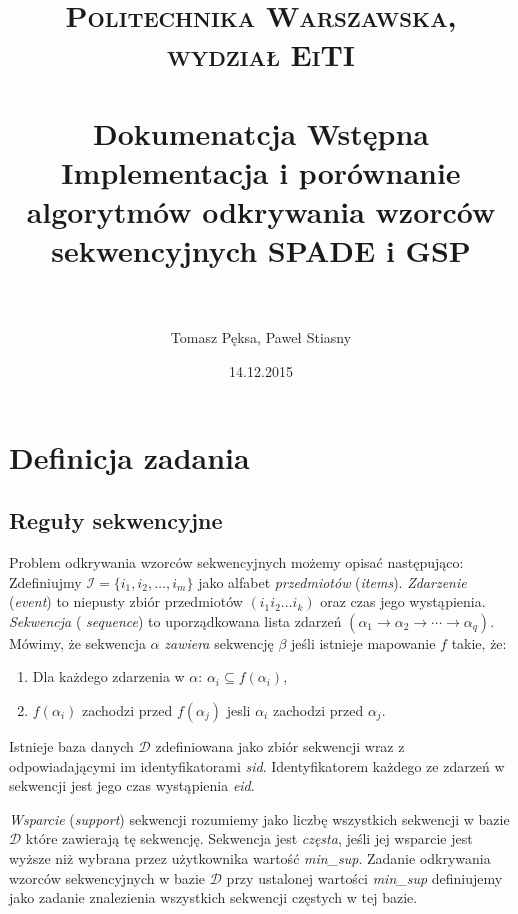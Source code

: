 \documentclass[paper=a4, fontsize=11pt]{scrartcl} %
\title{	
\normalfont \normalsize 
\textsc{Politechnika Warszawska, wydział EiTI} \\ [25pt] %
\horrule{0.5pt} \\[0.4cm] %
\huge Dokumenatcja Wstępna \\ %
\large Implementacja i porównanie algorytmów odkrywania wzorców sekwencyjnych SPADE i GSP \\
\horrule{2pt} \\[0.5cm] %
}
\author{Tomasz Pęksa, Paweł Stiasny} %
\date{\normalsize14.12.2015} %
\numberwithin{equation}{section} %
\numberwithin{figure}{section} %
\numberwithin{table}{section} %
\begin{document}
\maketitle %


\section{Definicja zadania}

\subsection{Reguły sekwencyjne}

Problem odkrywania wzorców sekwencyjnych możemy opisać następująco: Zdefiniujmy
\( \mathcal I = \{ i_1, i_2, \ldots, i_m \} \) jako alfabet {\em przedmiotów}
({\em items}).  {\em Zdarzenie} ({\em event}) to niepusty zbiór przedmiotów \(
( i_1i_2\ldots i_k ) \) oraz czas jego wystąpienia.  {\em Sekwencja} ({\em
sequence}) to uporządkowana lista zdarzeń \( ( \alpha_1 \rightarrow \alpha_2 \rightarrow \cdots \rightarrow \alpha_q ) \).
Mówimy, że sekwencja \( \alpha \) {\em zawiera} sekwencję \( \beta \) jeśli
istnieje mapowanie \( f \) takie, że:
\begin{enumerate}
    \item Dla każdego zdarzenia w \( \alpha \): \( \alpha_i \subseteq f(\alpha_i) \),
    \item \( f(\alpha_i) \) zachodzi przed \( f(\alpha_j) \) jesli \( \alpha_i \)
        zachodzi przed \( \alpha_j \).
\end{enumerate}

Istnieje baza danych \( \mathcal D \) zdefiniowana jako zbiór sekwencji wraz
z odpowiadającymi im identyfikatorami {\em sid}.  Identyfikatorem każdego ze
zdarzeń w sekwencji jest jego czas wystąpienia {\em eid}.

{\em Wsparcie} ({\em support}) sekwencji rozumiemy jako liczbę wszystkich
sekwencji w bazie \( \mathcal D \) które zawierają tę sekwencję.  Sekwencja
jest {\em częsta}, jeśli jej wsparcie jest wyższe niż wybrana przez użytkownika
wartość {\em min\_sup}.  Zadanie odkrywania wzorców sekwencyjnych w bazie \(
\mathcal D \) przy ustalonej wartości {\em min\_sup} definiujemy jako zadanie
znalezienia wszystkich sekwencji częstych w tej bazie.
\end{document}
